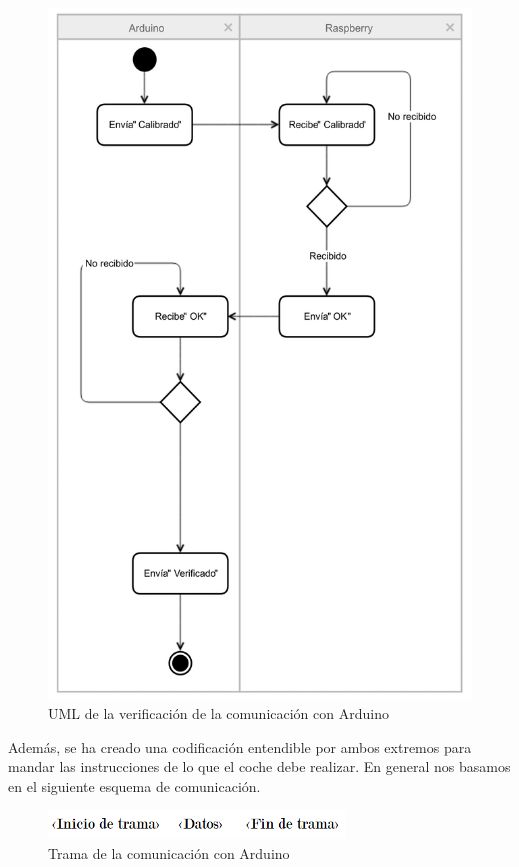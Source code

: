 \documentclass{pclass}
\begin{document}
\begin{itemize}
\begin{itemize}
	\begin{figure}[H]
		\centering
		\includegraphics[width=1\textwidth]{img/umlComunicacion}
		\caption{UML de la verificación de la comunicación con Arduino}
		\label{fig:arduinoVerificacion}
	\end{figure}
	
	Además, se ha creado una codificación entendible por ambos extremos para mandar las instrucciones de lo que el coche debe realizar. En general nos basamos en el siguiente esquema de comunicación.
	
	\begin{figure}[H]
		\centering
		\includegraphics[width=0.7\textwidth]{img/trama}
		\caption{Trama de la comunicación con Arduino}
		\label{fig:trama}
	\end{figure}
	

\end{itemize}
\end{itemize}
\end{document}
